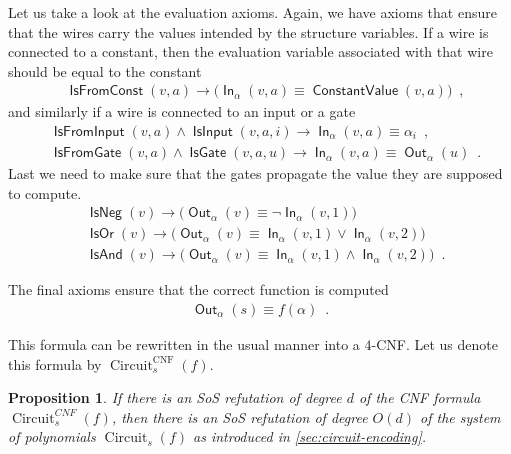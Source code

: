 \documentclass[10pt,a4paper]{article}
\theoremstyle{plain}
\newtheorem{proposition}[theorem]{Proposition}
\theoremstyle{remark}
\theoremstyle{definition}
\newcommand{\pa}[1]{}
\newcommand{\kr}[1]{}
\newcommand{\eqcomma}{\enspace ,}
\newcommand{\eqperiod}{\enspace .}
\newcommand{\vars}[1]{\mathsf{#1}}
\DeclareMathOperator{\circuit}{Circuit}
\DeclareMathOperator{\outwire}{\vars{Out}}
\DeclareMathOperator{\inwire}{\vars{In}}
\DeclareMathOperator{\isneg}{\vars{IsNeg}}
\DeclareMathOperator{\isand}{\vars{IsAnd}}
\DeclareMathOperator{\isor}{\vars{IsOr}}
\DeclareMathOperator{\isfromconst}{\vars{IsFromConst}}
\DeclareMathOperator{\isfromvar}{\vars{IsFromInput}}
\DeclareMathOperator{\isfromgate}{\vars{IsFromGate}}
\DeclareMathOperator{\constval}{\vars{ConstantValue}}
\DeclareMathOperator{\isvar}{\vars{IsInput}}
\DeclareMathOperator{\isgate}{\vars{IsGate}}
\begin{document}
Let us take a look at the evaluation axioms. Again, we have axioms
that ensure that the wires carry the values intended by the structure
variables. If a wire is connected to a constant, then the evaluation
variable associated with that wire should be equal to the constant
\begin{align}
  &\isfromconst(v, a)
    \rightarrow
    \big(\inwire_{
    \alpha}(v, a) \equiv \constval(v, a)\big) \eqcomma
\end{align}
and similarly if a wire is connected to an input or a gate
\begin{align}
  &\isfromvar(v, a) \wedge \isvar(v, a, i)
    \rightarrow
    \inwire_{\alpha}(v, a) \equiv \alpha_i \eqcomma\\
  &\isfromgate(v, a) \wedge \isgate(v, a, u)
    \rightarrow
    \inwire_{\alpha}(v, a) \equiv \outwire_{\alpha}(u) \eqperiod
\end{align}
Last we need to make sure that the gates propagate the value they are
supposed to compute.
\begin{align}
  &\isneg(v) \rightarrow
    \big(\outwire_{\alpha}(v) \equiv \neg \inwire_{\alpha}(v, 1)\big)\\
  &\isor(v) \rightarrow
    \big(\outwire_{\alpha}(v) \equiv \inwire_{\alpha}(v, 1) \vee \inwire_{\alpha}(v, 2)\big)\\
  &\isand(v) \rightarrow
    \big(\outwire_{\alpha}(v) \equiv \inwire_{\alpha}(v, 1) \wedge
    \inwire_{\alpha}(v, 2)\big)
    \eqperiod
\end{align}

The final axioms ensure that the correct function is computed
\begin{align}
  \outwire_{\alpha}(s) \equiv f(\alpha) \eqperiod
\end{align}

This formula can be rewritten in the usual manner into a $4$-CNF. Let
us denote this formula by $\circuit^{\mathrm{CNF}}_s(f)$.

\pa{Here the $4$ is because all axioms use at most 4 variables, right?  Can say this.}

\kr{It is a bit annoying: you have to consider it as a CNF and then
  each clause is over at most $4$ vars. The axioms themselves (for
  example \cref{ax:gate-cnf}) may depend on more variables. }

\begin{proposition}
  \label{prop:cnf-poly}
  If there is an SoS refutation of degree $d$ of the CNF formula
  $\circuit^{CNF}_s(f)$, then there is an SoS refutation of degree
  $O(d)$ of the system of polynomials $\circuit_s(f)$ as introduced in
  \cref{sec:circuit-encoding}.
\end{proposition}
\end{document}
